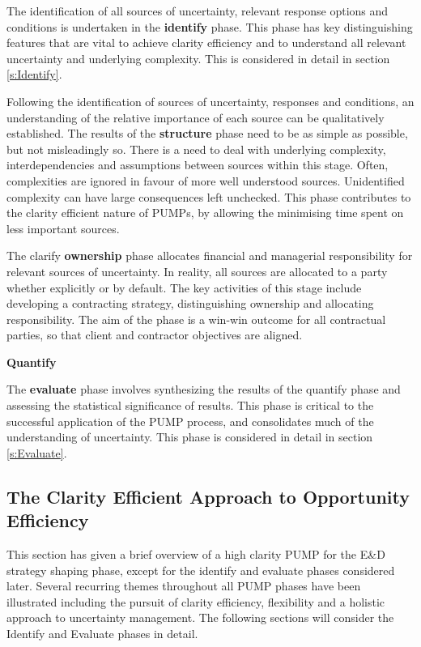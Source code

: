 The identification of all sources of uncertainty, relevant response options and conditions is undertaken in the \textbf{identify} phase.
This phase has key distinguishing features that are vital to achieve clarity efficiency and to understand all relevant uncertainty and underlying complexity.
This is considered in detail in section \ref{s:Identify}.

Following the identification of sources of uncertainty, responses and conditions, an understanding of the relative importance of each source can be qualitatively established.
The results of the \textbf{structure} phase need to be as simple as possible, but not misleadingly so.
There is a need to deal with underlying complexity, interdependencies and assumptions between sources within this stage.
Often, complexities are ignored in favour of more well understood sources.
Unidentified complexity can have large consequences left unchecked.
This phase contributes to the clarity efficient nature of PUMPs, by allowing the minimising time spent on less important sources.

The clarify \textbf{ownership} phase allocates financial and managerial responsibility for relevant sources of uncertainty.
In reality, all sources are allocated to a party whether explicitly or by default.
The key activities of this stage include developing a contracting strategy, distinguishing ownership and allocating responsibility.
The aim of the phase is a win-win outcome for all contractual parties, so that client and contractor objectives are aligned.

\textbf{Quantify}

The \textbf{evaluate} phase involves synthesizing the results of the quantify phase and assessing the statistical significance of results.
This phase is critical to the successful application of the PUMP process, and consolidates much of the understanding of uncertainty.
This phase is considered in detail in section \ref{s:Evaluate}.


\subsection{The Clarity Efficient Approach to Opportunity Efficiency}
This section has given a brief overview of a high clarity PUMP for the E\&D strategy shaping phase, except for the identify and evaluate phases considered later.
Several recurring themes throughout all PUMP phases have been illustrated including the pursuit of clarity efficiency, flexibility and a holistic approach to uncertainty management.
The following sections will consider the Identify and Evaluate phases in detail.


